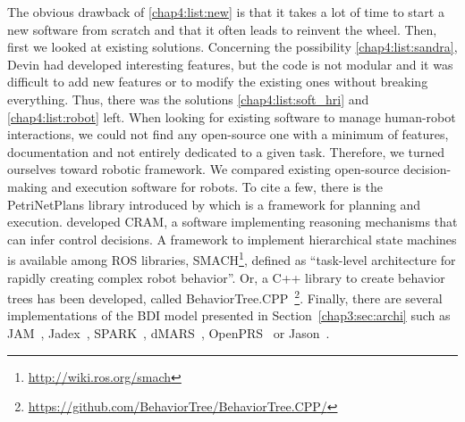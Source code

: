 \documentclass[a4paper,11pt,twoside]{StyleThese}
\begin{document}
The obvious drawback of \ref{chap4:list:new} is that it takes a lot of time to start a new software from scratch and that it often leads to reinvent the wheel. Then, first we looked at existing solutions. Concerning the possibility \ref{chap4:list:sandra}, Devin had developed interesting features, but the code is not modular and it was difficult to add new features or to modify the existing ones without breaking everything. Thus, there was the solutions \ref{chap4:list:soft_hri} and \ref{chap4:list:robot} left. When looking for existing software to manage human-robot interactions, we could not find any open-source one with a minimum of features, documentation and not entirely dedicated to a given task. Therefore, we turned ourselves toward robotic framework. We compared existing open-source decision-making and execution software for robots. To cite a few, there is the PetriNetPlans library introduced by \cite{ziparo_2011_petri} which is a framework for planning and execution. \cite{beetz_2010_cram} developed CRAM, a software implementing reasoning mechanisms that can infer control decisions. A framework to implement hierarchical state machines is available among ROS libraries, SMACH\footnote{\url{http://wiki.ros.org/smach}}, defined as ``task-level architecture for rapidly creating complex robot behavior''. Or, a C++ library to create behavior trees has been developed, called BehaviorTree.CPP~\footnote{\url{https://github.com/BehaviorTree/BehaviorTree.CPP/}}. Finally, there are several implementations of the BDI model presented in Section~\ref{chap3:sec:archi} such as JAM~\citep{huber_1999_jam}, Jadex~\citep{braudach_2005_jadex}, SPARK~\citep{morley_2004_spark}, dMARS~\citep{dinverno_1998_formal}, OpenPRS~\citep{ingrand_1996_prs} or Jason~\citep{bordini_2007_jason}. 
\end{document}
